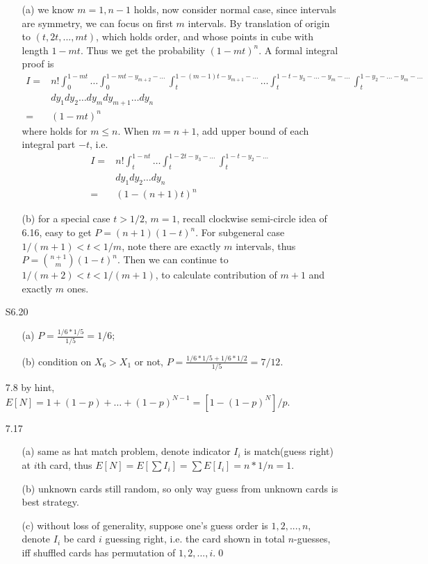 \documentclass[paper=a4, fontsize=11pt]{scrartcl} %
\numberwithin{equation}{section} %
\numberwithin{figure}{section} %
\numberwithin{table}{section} %
\begin{document}
\begin{itemize}
	\begin{itemize}
		\item[(a)] we know $m=1,n-1$ holds, now consider normal case, since intervals are symmetry, we can focus on first $m$ intervals. By translation of origin to $(t,2t,...,mt)$, which holds order, and whose points in cube with length $1-mt$. Thus we get the probability $(1-mt)^n$. A formal integral proof is
		\begin{align}
			I =& n! \int_0^{1-mt}\dots\int_0^{1-mt-y_{m+2}-\dots}\int_t^{1-(m-1)t-y_{m+1}-\dots}\dots\int_t^{1-t-y_3-\dots-y_m-\dots}\int_t^{1-y_2-\dots-y_m-\dots} \\
				& dy_1dy_2\dots dy_m dy_{m+1}\dots dy_n\\
				=& (1-mt)^n
		\end{align}
		where holds for $m\leq n$. When $m=n+1$, add upper bound of each integral part $-t$, i.e.
		\begin{align}
			I = & n! \int_t^{1-nt}\dots\int_t^{1-2t-y_3-\dots}\int_t^{1-t-y_2-\dots} \\
				& dy_1 dy_2\dots dy_n\\
				=& (1-(n+1)t)^n
		\end{align}
		\item[(b)] for a special case $t>1/2$, $m=1$, recall clockwise semi-circle idea of 6.16, easy to get $P=(n+1)(1-t)^n$. For subgeneral case $1/(m+1)<t<1/m$, note there are exactly $m$ intervals, thus $P={n+1\choose m}(1-t)^n$. Then we can continue to $1/(m+2)<t<1/(m+1)$, to calculate contribution of $m+1$ and exactly $m$ ones. 
	\end{itemize}
	\item[S6.20]
	\begin{itemize}
		\item[(a)] $P = \frac{1/6 *1/5}{1/5} = 1/6$;
		\item[(b)] condition on $X_6>X_1$ or not, $P = \frac{1/6 *1/5 + 1/6* 1/2}{1/5} = 7/12$.
	\end{itemize}
	\item[7.8] by hint, $E[N] = 1 + (1-p) +\dots +(1-p)^{N-1} = [1-(1-p)^N]/p$.
	\item[7.17]
	\begin{itemize}
		\item[(a)] same as hat match problem, denote indicator $I_i$ is match(guess right) at $i$th card, thus $E[N]= E[\sum I_i] = \sum E[I_i] = n* 1/n = 1$.
		\item[(b)] unknown cards still random, so only way guess from unknown cards is best strategy.
		\item[(c)] without loss of generality, suppose one's guess order is  $1,2,...,n$, denote $I_i$ be card $i$ guessing right, i.e. the card shown in total $n$-guesses, iff shuffled cards has permutation of $1,2,...,i$.\qed

\end{itemize}
\end{itemize}
\end{document}
